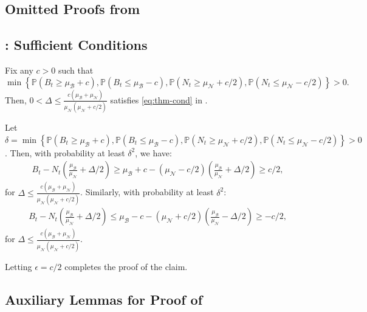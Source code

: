 \documentclass[mnsc,nonblindrev]{informs3}
\newcommand{\pr}{\mathbb{P}}
\renewcommand{\Pr}{\pr}
\newcommand{\NDist}{\mathcal{N}}
\newcommand{\BDist}{\mathcal{B}}
\newcommand{\Nmean}{\mu_{\NDist}}
\newcommand{\Bmean}{\mu_{\BDist}}
\renewenvironment{proof}[1][Proof]{%
  \par\noindent{\itshape #1.} \ignorespaces
}{%
  \hfill\Halmos\par
}
\begin{document}
\begin{APPENDICES}
\section{Omitted Proofs from }
\label{apx:bang-bang-full}


\subsection{: Sufficient Conditions}\label{apx:delta-cond}

\begin{proposition}\label{prop:delta-cond}
Fix any $c > 0$ such that
\[\min\left\{\Pr\left(B_t \geq \Bmean+c\right), \Pr\left(B_t \leq \Bmean-c\right), \Pr\left(N_t \geq \Nmean+c/2\right), \Pr\left(N_t \leq \Nmean-c/2\right)\right\} > 0.\] Then, $0 < \Delta \leq \frac{c\left(\Bmean+\Nmean\right)}{\Nmean(\Nmean+c/2)}$ satisfies \cref{eq:thm-cond} in .
\end{proposition}
 
\begin{proof}
Let $\delta = \min\left\{\Pr\left(B_t \geq \Bmean+c\right), \Pr\left(B_t \leq \Bmean-c\right), \Pr\left(N_t \geq \Nmean+c/2\right), \Pr\left(N_t \leq \Nmean-c/2\right)\right\} > 0$. Then, with probability at least $\delta^2$, we have:
\begin{align*}
B_t - N_t\left(\frac{\Bmean}{\Nmean}+\Delta/2\right) \geq \Bmean +c -(\Nmean-c/2)\left(\frac{\Bmean}{\Nmean}+\Delta/2\right) \geq c/2,
\end{align*}
for $\Delta \leq \frac{c\left(\Bmean+\Nmean\right)}{\Nmean(\Nmean+c/2)}$.
Similarly, with probability at least $\delta^2$:
\begin{align*}
B_t - N_t\left(\frac{\Bmean}{\Nmean}+\Delta/2\right) \leq \Bmean -c -(\Nmean+c/2)\left(\frac{\Bmean}{\Nmean}-\Delta/2\right) \geq -c/2,
\end{align*}
for $\Delta \leq \frac{c\left(\Bmean+\Nmean\right)}{\Nmean(\Nmean+c/2)}$.

Letting $\epsilon = c/2$ completes the proof of the claim.
\end{proof}





\subsection{Auxiliary Lemmas for Proof of }
\label{apx:bang-bang-aux}



\end{APPENDICES}
\end{document}
